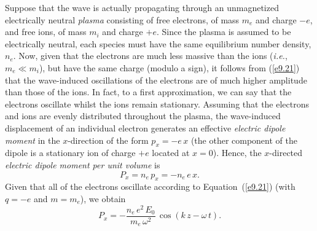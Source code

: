 Suppose that the wave is actually propagating through an unmagnetized electrically neutral  {\em plasma}\/ consisting
of free electrons, of mass $m_e$ and charge $-e$, and free ions, of mass $m_i$
and charge $+e$. Since the plasma is assumed to be electrically neutral, each species must have the same equilibrium number density, 
$n_e$. Now, given that the electrons are much less massive than the ions ({\em i.e.}, $m_e\ll m_i$), but have the same charge (modulo a sign), it follows from (\ref{e9.21}) that the wave-induced oscillations of the electrons
are of much higher amplitude than those of the ions. In fact, to a first approximation,
we can say that the electrons oscillate whilst the ions remain stationary. 
Assuming that the electrons and ions are  evenly distributed throughout the
plasma, the wave-induced displacement of an individual electron generates an effective {\em electric
dipole moment}\/ in the $x$-direction of the form $p_x = -e\,x$ (the other component of  the dipole is
a stationary ion of charge $+e$ located at $x=0$).  
Hence, the $x$-directed
{\em electric dipole moment per unit volume}\/ is
\begin{equation}\label{e9.22a}
P_x = n_e\,p_x = -n_e\,e\,x.
\end{equation}
Given that all of the
electrons oscillate according to Equation~(\ref{e9.21}) (with $q=-e$ and $m=m_e$),
we obtain
\begin{equation}\label{e9.22}
 P_x= - \frac{n_e\,e^2\,E_0}{m_e\,\omega^2}\,\cos(k\,z-\omega\,t).
\end{equation}

